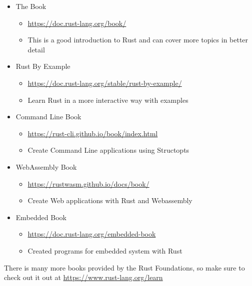 \begin{itemize}
    \item The Book
    \begin{itemize}
        \item \url{https://doc.rust-lang.org/book/}
        \item This is a good introduction to Rust and can cover more topics in better detail
    \end{itemize}
    \item Rust By Example
    \begin{itemize}
        \item \url{https://doc.rust-lang.org/stable/rust-by-example/}
        \item Learn Rust in a more interactive way with examples
    \end{itemize}
    \item Command Line Book
    \begin{itemize}
        \item \url{https://rust-cli.github.io/book/index.html}
        \item Create Command Line applications using Structopts 
    \end{itemize}
    \item WebAssembly Book
    \begin{itemize}
        \item \url{https://rustwasm.github.io/docs/book/}
        \item Create Web applications with Rust and Webassembly
    \end{itemize}
    \item Embedded Book
    \begin{itemize}
        \item \url{https://doc.rust-lang.org/embedded-book}
        \item Created programs for embedded system with Rust
    \end{itemize}
\end{itemize}
There is many more books provided by the Rust Foundations, so make sure 
to check out it out at \url{https://www.rust-lang.org/learn}